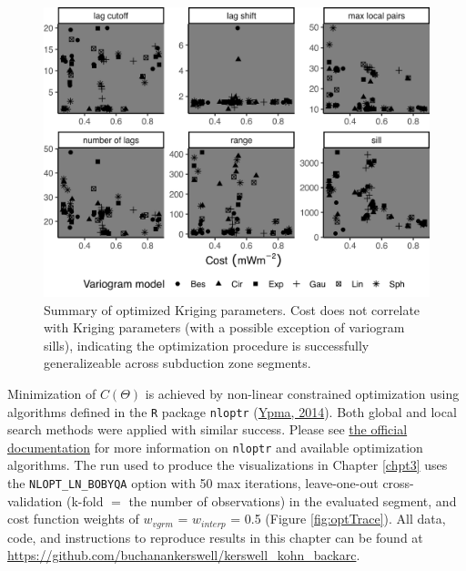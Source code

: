 \begin{figure}[htbp]

{\centering \includegraphics[width=1\linewidth,]{assets/figs/chpt3/vgrmSummary} 

}

\caption[Summary of optimized variogram models]{Summary of optimized Kriging parameters. Cost does not correlate with Kriging parameters (with a possible exception of variogram sills), indicating the optimization procedure is successfully generalizeable across subduction zone segments.}\label{fig:vgrmSummaryPlot}
\end{figure}

Minimization of \(C(\Theta)\) is achieved by non-linear constrained optimization using algorithms defined in the \texttt{R} package \texttt{nloptr} (\protect\hyperlink{ref-ypma2014}{Ypma, 2014}). Both global and local search methods were applied with similar success. Please see \href{https://nlopt.readthedocs.io/en/latest/NLopt_Introduction/}{the official documentation} for more information on \texttt{nloptr} and available optimization algorithms. The run used to produce the visualizations in Chapter \ref{chpt3} uses the \texttt{NLOPT\_LN\_BOBYQA} option with 50 max iterations, leave-one-out cross-validation (k-fold \(=\) the number of observations) in the evaluated segment, and cost function weights of \(w_{vgrm}\) = \(w_{interp}\) = 0.5 (Figure \ref{fig:optTrace}). All data, code, and instructions to reproduce results in this chapter can be found at \url{https://github.com/buchanankerswell/kerswell_kohn_backarc}.



